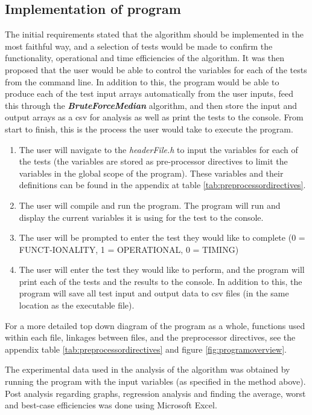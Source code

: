 \documentclass[12pt]{article}
\begin{document}
	\subsection{Implementation of program}
	The initial requirements stated that the algorithm should be implemented in the most faithful way, and a selection of tests would be made to confirm the functionality, operational and time efficiencies of the algorithm. It was then proposed that the user would be able to control the variables for each of the tests from the command line. In addition to this, the program would be able to produce each of the test input arrays automatically from the user inputs, feed this through the \textit{\textbf{BruteForceMedian}} algorithm, and then store the input and output arrays as a csv for analysis as well as print the tests to the console. From start to finish, this is the process the user would take to execute the program. 
	\begin{enumerate}
		\item The user will navigate to the \textit{headerFile.h} to input the variables for each of the tests (the variables are stored as pre-processor directives to limit the variables in the global scope of the program). These variables and their definitions can be found in the appendix at table \ref{tab:preprocessordirectives}.
		\item The user will compile and run the program. The program will run and display the current variables it is using for the test to the console.
		\item The user will be prompted to enter the test they would like to complete (0 = FUNCT\newline-IONALITY, 1 = OPERATIONAL, 0 = TIMING)
		\item The user will enter the test they would like to perform, and the program will print each of the tests and the results to the console. In addition to this, the program will save all test input and output data to csv files (in the same location as the executable file).
	\end{enumerate}
	For a more detailed top down diagram of the program as a whole, functions used within each file, linkages between files, and the preprocessor directives, see the appendix table \ref{tab:preprocessordirectives} and figure \ref{fig:programoverview}. 
	
	The experimental data used in the analysis of the algorithm was obtained by running the program with the input variables (as specified in the method above). Post analysis regarding graphs, regression analysis and finding the average, worst and best-case efficiencies was done using Microsoft Excel. 
\end{document}
